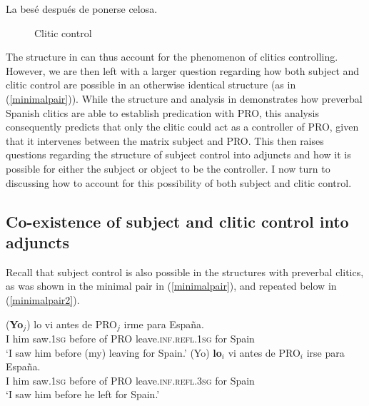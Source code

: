 \documentclass[output=paper,colorlinks,citecolor=brown]{langscibook}
\begin{document}
\ea \label{cctree} {La besé después de ponerse celosa.}
\z

\begin{figure}
\caption{Clitic control}
\label{fig:cctree}
\end{figure}

The structure in  can thus account for the phenomenon of clitics controlling. However, we are then left with a larger question regarding how both subject and clitic control are possible in an otherwise identical structure (as in (\ref{minimalpair})). While the structure and analysis in  demonstrates how preverbal Spanish clitics are able to establish predication with PRO, this analysis consequently predicts that only the clitic could act as a controller of PRO, given that it intervenes between the matrix subject and PRO. This then raises questions regarding the structure of subject control into adjuncts and how it is possible for either the subject or object to be the controller. I now turn to discussing how to account for this possibility of both subject and clitic control.


\subsection{Co-existence of subject and clitic control into adjuncts} \label{section4.2}

Recall that subject control is also possible in the structures with preverbal clitics, as was
shown in the minimal pair in (\ref{minimalpair}), and repeated below in (\ref{minimalpair2}).

\ea \label{minimalpair2}
\ea \label{minimalpairS2}
{
\gll (\textbf{Yo$_j$}) lo vi antes de PRO$_j$ irme para España. \\
I him saw.\textsc{1sg} before of PRO leave.\textsc{inf.refl.1sg} for Spain\\
\glt ‘I saw him before (my) leaving for Spain.’
}
\ex \label{minimalpairC2}
{
\gll (Yo) \textbf{lo$_i$} vi antes de PRO$_i$ irse para España. \\
I him saw.\textsc{1sg} before of PRO leave.\textsc{inf.refl.3sg} for Spain\\
\glt ‘I saw him before he left for Spain.’
}
\z
\z
\end{document}

